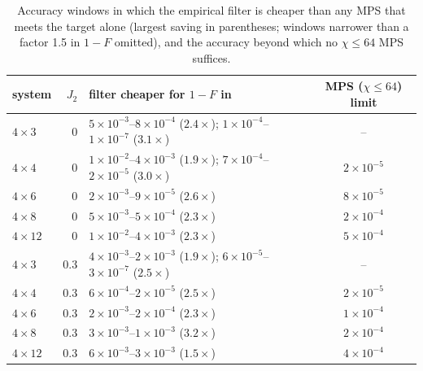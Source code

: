 \documentclass[10pt]{article}
\begin{document}
\begin{table}[h]
\centering\small
\caption{Accuracy windows in which the empirical filter is cheaper than any MPS that meets the target alone
(largest saving in parentheses; windows narrower than a factor 1.5 in $1-F$ omitted), and the accuracy
beyond which no $\chi\le64$ MPS suffices.}
\begin{tabular}{lrlc}
\toprule
system & $J_2$ & filter cheaper for $1-F$ in & MPS ($\chi\le64$) limit \\
\midrule
$4\times3$ & 0 & $5\times10^{-3}$--$8\times10^{-4}$ ($2.4\times$); $1\times10^{-4}$--$1\times10^{-7}$ ($3.1\times$) & -- \\
$4\times4$ & 0 & $1\times10^{-2}$--$4\times10^{-3}$ ($1.9\times$); $7\times10^{-4}$--$2\times10^{-5}$ ($3.0\times$) & $2\times10^{-5}$ \\
$4\times6$ & 0 & $2\times10^{-3}$--$9\times10^{-5}$ ($2.6\times$) & $8\times10^{-5}$ \\
$4\times8$ & 0 & $5\times10^{-3}$--$5\times10^{-4}$ ($2.3\times$) & $2\times10^{-4}$ \\
$4\times12$ & 0 & $1\times10^{-2}$--$4\times10^{-3}$ ($2.3\times$) & $5\times10^{-4}$ \\
$4\times3$ & 0.3 & $4\times10^{-3}$--$2\times10^{-3}$ ($1.9\times$); $6\times10^{-5}$--$3\times10^{-7}$ ($2.5\times$) & -- \\
$4\times4$ & 0.3 & $6\times10^{-4}$--$2\times10^{-5}$ ($2.5\times$) & $2\times10^{-5}$ \\
$4\times6$ & 0.3 & $2\times10^{-3}$--$2\times10^{-4}$ ($2.3\times$) & $1\times10^{-4}$ \\
$4\times8$ & 0.3 & $3\times10^{-3}$--$1\times10^{-3}$ ($3.2\times$) & $2\times10^{-4}$ \\
$4\times12$ & 0.3 & $6\times10^{-3}$--$3\times10^{-3}$ ($1.5\times$) & $4\times10^{-4}$ \\
\bottomrule
\end{tabular}
\end{table}
\end{document}
